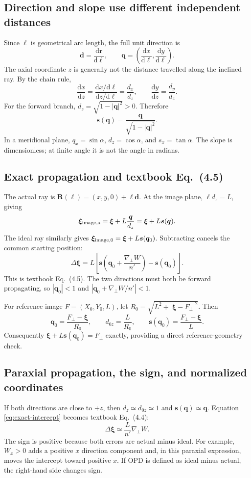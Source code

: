 \documentclass[11pt,a4paper]{article}
\numberwithin{equation}{section}
\newcommand{\dd}{\mathrm{d}}
\newcommand{\gradp}{\nabla_{\!\perp}}
\newcommand{\vct}[1]{\bm{#1}}
\begin{document}
\subsection{Direction and slope use different independent distances}
Since $\ell$ is geometrical arc length, the full unit direction is
\[
 \vct d=\frac{\dd\vct r}{\dd\ell},\qquad
 \vct q=\left(\frac{\dd x}{\dd\ell},\frac{\dd y}{\dd\ell}\right).
\]
The axial coordinate $z$ is generally not the distance travelled along
the inclined ray. By the chain rule,
\[
 \frac{\dd x}{\dd z}
 =\frac{\dd x/\dd\ell}{\dd z/\dd\ell}
 =\frac{d_x}{d_z},\qquad
 \frac{\dd y}{\dd z}=\frac{d_y}{d_z}.
\]
For the forward branch,
$d_z=\sqrt{1-|\vct q|^2}>0$. Therefore
\begin{equation}
 \boxed{
 \vct s(\vct q)=\frac{\vct q}{\sqrt{1-|\vct q|^2}}.
 }
 \label{eq:slope}
\end{equation}
In a meridional plane, $q_x=\sin\alpha$, $d_z=\cos\alpha$, and
$s_x=\tan\alpha$.
The slope is dimensionless; at finite angle it is not the angle in radians.

\subsection{Exact propagation and textbook Eq.~(4.5)}
The actual ray is
$\vct R(\ell)=(x,y,0)+\ell\vct d$.
At the image plane, $\ell d_z=L$, giving
\[
 \vct\xi_{\rm image,a}=\vct\xi+L\frac{\vct q}{d_z}
 =\vct\xi+L\vct s(\vct q).
\]
The ideal ray similarly gives
$\vct\xi_{\rm image,0}=\vct\xi+L\vct s(\vct q_0)$.
Subtracting cancels the common starting position:
\begin{equation}
 \boxed{
 \Delta\vct\xi
 =L\left[
 \vct s\left(\vct q_0+\frac{\gradp W}{n'}\right)
 -\vct s(\vct q_0)
 \right].
 }
 \label{eq:exact-intercept}
\end{equation}
This is textbook Eq.~(4.5). The two directions must both be forward
propagating, so $|\vct q_0|<1$ and
$|\vct q_0+\gradp W/n'|<1$.

For reference image $F=(X_0,Y_0,L)$, let
$R_0=\sqrt{L^2+|\vct\xi-F_\perp|^2}$. Then
\[
 \vct q_0=\frac{F_\perp-\vct\xi}{R_0},\qquad
 d_{0z}=\frac L{R_0},\qquad
 \vct s(\vct q_0)=\frac{F_\perp-\vct\xi}{L}.
\]
Consequently $\vct\xi+L\vct s(\vct q_0)=F_\perp$ exactly, providing a
direct reference-geometry check.

\subsection{Paraxial propagation, the sign, and normalized coordinates}
If both directions are close to $+z$, then $d_z\simeq d_{0z}\simeq1$
and $\vct s(\vct q)\simeq\vct q$. Equation
\eqref{eq:exact-intercept} becomes textbook Eq.~(4.4):
\begin{equation}
 \boxed{
 \Delta\vct\xi\simeq\frac{L}{n'}\gradp W.
 }
 \label{eq:parax-intercept}
\end{equation}
The sign is positive because both errors are actual minus ideal.
For example, $W_x>0$ adds a positive $x$ direction component and, in this
paraxial expression, moves the intercept toward positive $x$.
If OPD is defined as ideal minus actual, the right-hand side changes sign.
\end{document}
